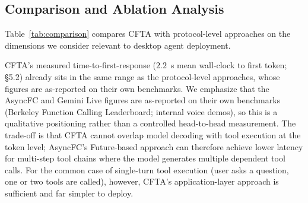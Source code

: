 \documentclass[numbered,mediumone,traditional]{oup-authoring-template}
\begin{document}
\subsection{Comparison and Ablation Analysis}

Table~\ref{tab:comparison} compares CFTA with protocol-level approaches on the dimensions we consider relevant to desktop agent deployment.

\begin{table}[htbp]
\caption{CFTA vs.\ protocol-level approaches.}
\label{tab:comparison}
\centering
{}
\end{table}

CFTA's measured time-to-first-response ($2.2$~s mean wall-clock to first token; \S5.2) already sits in the same range as the protocol-level approaches, whose figures are as-reported on their own benchmarks. We emphasize that the AsyncFC and Gemini Live figures are as-reported on their own benchmarks (Berkeley Function Calling Leaderboard; internal voice demos), so this is a qualitative positioning rather than a controlled head-to-head measurement. The trade-off is that CFTA cannot overlap model decoding with tool execution at the token level; AsyncFC's Future-based approach can therefore achieve lower latency for multi-step tool chains where the model generates multiple dependent tool calls. For the common case of single-turn tool execution (user asks a question, one or two tools are called), however, CFTA's application-layer approach is sufficient and far simpler to deploy.
\end{document}
